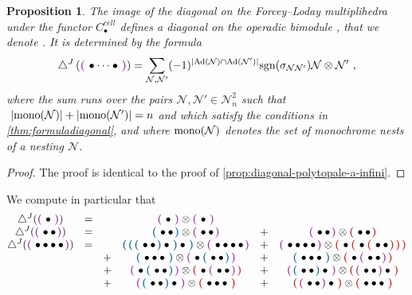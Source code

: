 \documentclass[twoside, 12pt]{amsart}
\newtheorem{proposition}[definition]{Proposition}
\theoremstyle{remark}
\begin{document}
\begin{proposition}
\label{prop:diagonal-polytopale-m-infini}
The image of the diagonal on the Forcey--Loday multiplihedra under the functor $C_\bullet^{cell}$ defines a diagonal on the operadic bimodule \Minf , that we denote \diagminf . It is determined by the formula
\[ \diagminf \left( \purple{\bullet \cdots \bullet} \right) = 
\sum_{
\mathcal{N},\mathcal{N}'} 
(-1)^{|\mathrm{Ad}(\mathcal{N})\cap \mathrm{Ad}(\mathcal{N}')|}
\mathrm{sgn}(\sigma_{\mathcal{N}\mathcal{N}'})
\mathcal{N} \otimes \mathcal{N}' \ ,\]
where the sum runs over the pairs $\mathcal{N},\mathcal{N}' \in \mathcal{N}^2_n$ such that $\ |\mono(\mathcal{N})|+|\mono(\mathcal{N}')|=n$ and which satisfy the conditions in \cref{thm:formuladiagonal}, and where $\mathrm{mono}(\mathcal{N})$ denotes the set of monochrome nests of a nesting $\mathcal{N}$. 
\end{proposition}

\begin{proof}
The proof is identical to the proof of \cref{prop:diagonal-polytopale-a-infini}. 
\end{proof}

We compute in particular that 
\[
\begin{matrix}
    \diagminf ( \purple{ \bullet } )  &=&  & \purple{ \bullet } \otimes \purple{ \bullet } & &  \\
    \diagminf ( \purple{ \bullet \bullet } ) &=& & \blue{\bullet \bullet} \otimes \purple{\bullet \bullet} & + & \purple{\bullet \bullet} \otimes \red{\bullet \bullet} \\
    \diagminf (\purple{\bullet \bullet \bullet \bullet}) &=& 
     & \blue{\blue{\blue{\bullet \bullet}\bullet}\bullet} \otimes \purple{\bullet \bullet \bullet \bullet} 
      & + & \purple{\bullet \bullet \bullet \bullet} \otimes \red{\bullet \red{\bullet \red{\bullet \bullet}}} \\
& &+ &  \blue{\bullet \bullet \bullet} \otimes \purple{\bullet \blue{\bullet \bullet}}    &  + & \blue{\bullet \bullet \bullet} \otimes \red{\bullet \purple{\bullet \bullet}}  \\  &   &+ & \purple{\bullet \blue{\bullet \bullet}} \otimes \red{\bullet \purple{\bullet \bullet}} 
  &  + & \purple{\blue{\bullet \bullet} \bullet} \otimes \red{\purple{\bullet \bullet} \bullet} \\ & &  + & \purple{\blue{\bullet \bullet} \bullet} \otimes \red{\bullet \bullet \bullet}   &  + & \red{\purple{\bullet \bullet} \bullet} \otimes \red{\bullet \bullet \bullet} 
  \end{matrix}
\]
\end{document}
